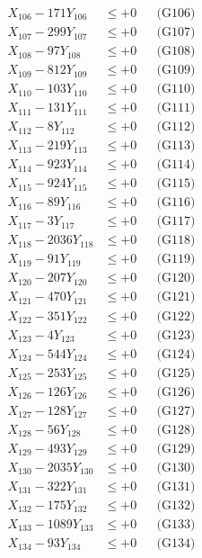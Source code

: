 \documentclass[a4paper,10pt]{article}
\begin{document}
{\begin{align}
X_{106} - 171Y_{106} &\leq +0 && \text{(G106)} \\
X_{107} - 299Y_{107} &\leq +0 && \text{(G107)} \\
X_{108} - 97Y_{108} &\leq +0 && \text{(G108)} \\
X_{109} - 812Y_{109} &\leq +0 && \text{(G109)} \\
X_{110} - 103Y_{110} &\leq +0 && \text{(G110)} \\
\allowbreak
X_{111} - 131Y_{111} &\leq +0 && \text{(G111)} \\
X_{112} - 8Y_{112} &\leq +0 && \text{(G112)} \\
X_{113} - 219Y_{113} &\leq +0 && \text{(G113)} \\
X_{114} - 923Y_{114} &\leq +0 && \text{(G114)} \\
X_{115} - 924Y_{115} &\leq +0 && \text{(G115)} \\
X_{116} - 89Y_{116} &\leq +0 && \text{(G116)} \\
X_{117} - 3Y_{117} &\leq +0 && \text{(G117)} \\
X_{118} - 2036Y_{118} &\leq +0 && \text{(G118)} \\
X_{119} - 91Y_{119} &\leq +0 && \text{(G119)} \\
X_{120} - 207Y_{120} &\leq +0 && \text{(G120)} \\
\allowbreak
X_{121} - 470Y_{121} &\leq +0 && \text{(G121)} \\
X_{122} - 351Y_{122} &\leq +0 && \text{(G122)} \\
X_{123} - 4Y_{123} &\leq +0 && \text{(G123)} \\
X_{124} - 544Y_{124} &\leq +0 && \text{(G124)} \\
X_{125} - 253Y_{125} &\leq +0 && \text{(G125)} \\
X_{126} - 126Y_{126} &\leq +0 && \text{(G126)} \\
X_{127} - 128Y_{127} &\leq +0 && \text{(G127)} \\
X_{128} - 56Y_{128} &\leq +0 && \text{(G128)} \\
X_{129} - 493Y_{129} &\leq +0 && \text{(G129)} \\
X_{130} - 2035Y_{130} &\leq +0 && \text{(G130)} \\
\allowbreak
X_{131} - 322Y_{131} &\leq +0 && \text{(G131)} \\
X_{132} - 175Y_{132} &\leq +0 && \text{(G132)} \\
X_{133} - 1089Y_{133} &\leq +0 && \text{(G133)} \\
X_{134} - 93Y_{134} &\leq +0 && \text{(G134)} \\

\end{align}}
\end{document}
